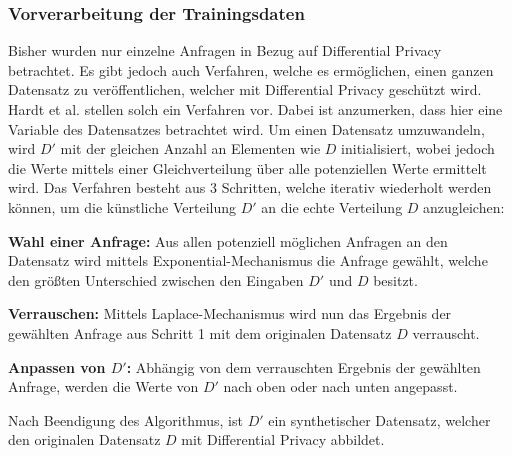 \subsubsection*{Vorverarbeitung der Trainingsdaten}
Bisher wurden nur einzelne Anfragen in Bezug auf Differential Privacy betrachtet.
Es gibt jedoch auch Verfahren, welche es ermöglichen, einen ganzen Datensatz zu veröffentlichen, welcher mit Differential Privacy geschützt wird.
Hardt et al. \cite{P-90} stellen solch ein Verfahren vor.
Dabei ist anzumerken, dass hier eine Variable des Datensatzes betrachtet wird.
Um einen Datensatz umzuwandeln, wird $D'$ mit der gleichen Anzahl an Elementen wie $D$ initialisiert, wobei jedoch die Werte mittels einer Gleichverteilung über alle potenziellen Werte ermittelt wird.
Das Verfahren besteht aus 3 Schritten, welche iterativ wiederholt werden können, um die künstliche Verteilung $D'$ an die echte Verteilung $D$ anzugleichen:
\begin{compactenum}
    \item \textbf{Wahl einer Anfrage:} Aus allen potenziell möglichen Anfragen an den Datensatz wird mittels Exponential-Mechanismus die Anfrage gewählt, welche den größten Unterschied zwischen den Eingaben $D'$ und $D$ besitzt.
    \item \textbf{Verrauschen:} Mittels Laplace-Mechanismus wird nun das Ergebnis der gewählten Anfrage aus Schritt 1 mit dem originalen Datensatz $D$ verrauscht.
    \item \textbf{Anpassen von $D'$:} Abhängig von dem verrauschten Ergebnis der gewählten Anfrage, werden die Werte von $D'$ nach oben oder nach unten angepasst.
\end{compactenum}
Nach Beendigung des Algorithmus, ist $D'$ ein synthetischer Datensatz, welcher den originalen Datensatz $D$ mit Differential Privacy abbildet.